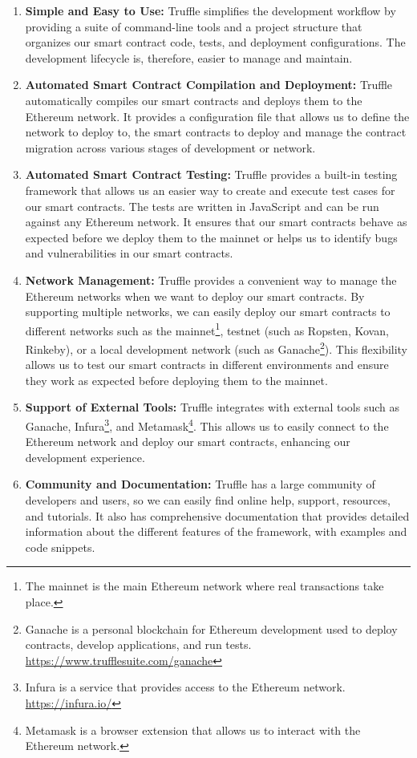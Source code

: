 \begin{enumerate}
  \item \textbf{Simple and Easy to Use:}  Truffle simplifies the development workflow by providing a suite of command-line tools and a project structure that
        organizes our smart contract code, tests, and deployment configurations. The development lifecycle is, therefore, easier to manage and maintain.
  \item \textbf{Automated Smart Contract Compilation and Deployment:} Truffle automatically compiles our smart contracts and deploys them to the Ethereum network.
        It provides a configuration file that allows us to define the network to deploy to, the smart contracts to deploy and manage the contract migration across various
        stages of development or network.
  \item \textbf{Automated Smart Contract Testing:} Truffle provides a built-in testing framework that allows us an easier way to create and execute test cases
        for our smart contracts. The tests are written in JavaScript and can be run against any Ethereum network. It ensures that our smart contracts behave as expected
        before we deploy them to the mainnet or helps us to identify bugs and vulnerabilities in our smart contracts.
  \item \textbf{Network Management:} Truffle provides a convenient way to manage the Ethereum networks when we want to deploy our smart contracts. By supporting
        multiple networks, we can easily deploy our smart contracts to different networks such as the mainnet\footnote{The mainnet is the main Ethereum network where real transactions take place.},
        testnet (such as Ropsten, Kovan, Rinkeby), or a local development network (such as Ganache\footnote{Ganache is a personal blockchain for Ethereum development
            used to deploy contracts, develop applications, and run tests. \url{https://www.trufflesuite.com/ganache}}). This flexibility allows us to test our smart contracts in different environments and ensure
        they work as expected before deploying them to the mainnet.
  \item \textbf{Support of External Tools:} Truffle integrates with external tools such as Ganache, Infura\footnote{Infura is a service that provides access to the Ethereum network. \url{https://infura.io/}},
        and Metamask\footnote{Metamask is a browser extension that allows us to interact with the Ethereum network.}. This allows us to easily connect to the Ethereum
        network and deploy our smart contracts, enhancing our development experience.
  \item \textbf{Community and Documentation:} Truffle has a large community of developers and users, so we can easily find online help, support, resources,
        and tutorials. It also has comprehensive documentation that provides detailed information about the different features of the framework, with examples
        and code snippets.
\end{enumerate}


